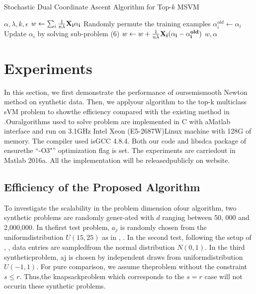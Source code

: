 \documentclass[journal]{IEEEtran}
\begin{document}
\begin{algorithm}
	\caption{Stochastic Dual Coordinate Ascent Algorithm for Top-$k$ MSVM} 
	\label{alg1}
	\begin{algorithmic}[1]
		\REQUIRE $\alpha, \lambda, k, \epsilon$
		\STATE $w \leftarrow \sum_i \frac{1}{n\lambda}\bf{X}_i\alpha_i$
		\STATE Randomly permute the training examples
		\STATE $\alpha_i^{old} \leftarrow \alpha_i$
		\STATE Update $\alpha_i$ by solving sub-problem (6)
		\STATE $w \leftarrow w + \frac{1}{n\lambda}\bf{X}_i(\alpha_i - \alpha_i^{old})$
		\ENDFOR
		\ENDWHILE
		\ENSURE $w, \alpha$
	\end{algorithmic}
\end{algorithm}

\section{Experiments}
In this section, we first demonstrate the performance of oursemismooth Newton method on synthetic data. Then, we applyour algorithm to the top-k multiclass sVM problem to showthe efficiency compared with the existing method in \cite{Lapin2015Top}.Ouralgorithms used to solve problem are implemented in C with aMatlab interface and run on 3.1GHz Intel Xeon (E5-2687W)Linux machine with 128G of memory. The compiler used isGCC 4.8.4. Both our code and libsdca package of \cite{Lapin2015Top} ensurethe “-O3"” optimization flag is set. The experiments are carriedout in Matlab 2016a. All the implementation will be releasedpublicly on website.

\subsection{Efficiency of the Proposed Algorithm}
To investigate the scalability in the problem dimension ofour algorithm, two synthetic problems are randomly gener-ated with $d$ ranging between 50, 000 and 2,000,000. In thefirst test problem, $a_j$ is randomly chosen from the uniformdistribution $U(15,25)$ as in \cite{Cominetti2014Newtons}, \cite{Kiwiel2008Variable}. In the second test, following the setup of \cite{Lapin2015Top}, \cite{Gong2011Efficient}, data entries are sampledfrom the normal distribution $N(0,1)$. In the third syntheticproblem, aj is chosen by independent draws from uniformdistribution $U(-1,1)$. For pure comparison, we assume theproblem without the constraint $s \leq r$. Thus,the knapsackproblem which corresponds to the $s = r$ case will not occurin these synthetic problems.
\end{document}
